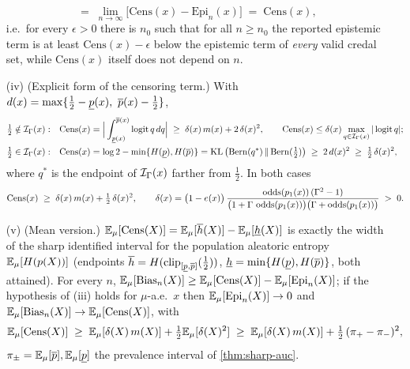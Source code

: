 \begin{corollary}
\begin{enumerate}
\begin{equation}
    \;=\;\lim_{n\to\infty}\big[\mathrm{Cens}(x)-\mathrm{Epi}_n(x)\big]\;=\;\mathrm{Cens}(x),
    \label{eq:uq-overconf}
  \end{equation}
  i.e.\ for every $\epsilon>0$ there is $n_0$ such that for all $n\ge n_0$ the reported
  epistemic term is at least $\mathrm{Cens}(x)-\epsilon$ below the epistemic term of
  \emph{every} valid credal set, while $\mathrm{Cens}(x)$ itself does not depend on $n$.
\item[(iv)] \textup{(Explicit form of the censoring term.)} With
  $d(x)=\max\{\tfrac12-\plo(x),\ \pup(x)-\tfrac12\}$,
  \begin{align}
    \tfrac12\notin\mathcal{I}_\Gamma(x):&\quad
      \mathrm{Cens}(x)=\Big|\int_{\underline{p}(x)}^{\overline{p}(x)}\operatorname{logit} q\,dq\Big|
      \;\ge\;\delta(x)\,m(x)+2\,\delta(x)^2,\qquad
      \mathrm{Cens}(x)\le\delta(x)\max_{q\in\mathcal{I}_\Gamma(x)}|\operatorname{logit} q|;
      \label{eq:cens-mono}\\
    \tfrac12\in\mathcal{I}_\Gamma(x):&\quad
      \mathrm{Cens}(x)=\log2-\min\{H(\underline{p}),H(\overline{p})\}
      =\operatorname{KL}\big(\mathrm{Bern}(q^\ast)\,\|\,\mathrm{Bern}(\tfrac12)\big)
      \;\ge\;2\,d(x)^2\;\ge\;\tfrac12\,\delta(x)^2,
      \label{eq:cens-inside}
  \end{align}
  where $q^\ast$ is the endpoint of $\mathcal{I}_\Gamma(x)$ farther from $\tfrac12$. In both cases
  \begin{equation}
    \mathrm{Cens}(x)\;\ge\;\delta(x)\,m(x)+\tfrac12\,\delta(x)^2,
    \qquad
    \delta(x)=\big(1-e(x)\big)\,\frac{\operatorname{odds}(p_1(x))\,(\Gamma^2-1)}
        {\big(1+\Gamma\,\operatorname{odds}(p_1(x))\big)\big(\Gamma+\operatorname{odds}(p_1(x))\big)}\;>\;0 .
    \label{eq:cens-unified}
  \end{equation}
\item[(v)] \textup{(Mean version.)} $\mathbb{E}_\mu[\mathrm{Cens}(X)]=\mathbb{E}_\mu[\overline h(X)]-\mathbb{E}_\mu[\underline h(X)]$
  is exactly the width of the sharp identified interval for the population aleatoric entropy
  $\mathbb{E}_\mu[H(p(X))]$ (endpoints $\overline h=H(\mathrm{clip}_{[\underline{p},\overline{p}]}(\tfrac12))$,
  $\underline h=\min\{H(\underline{p}),H(\overline{p})\}$, both attained). For every $n$,
  $\mathbb{E}_\mu[\mathrm{Bias}_n(X)]\ge\mathbb{E}_\mu[\mathrm{Cens}(X)]-\mathbb{E}_\mu[\mathrm{Epi}_n(X)]$; if the
  hypothesis of (iii) holds for $\mu$-a.e.\ $x$ then $\mathbb{E}_\mu[\mathrm{Epi}_n(X)]\to0$ and
  $\mathbb{E}_\mu[\mathrm{Bias}_n(X)]\to\mathbb{E}_\mu[\mathrm{Cens}(X)]$, with
  \begin{equation}
    \mathbb{E}_\mu[\mathrm{Cens}(X)]\;\ge\;\mathbb{E}_\mu[\delta(X)\,m(X)]+\tfrac12\mathbb{E}_\mu[\delta(X)^2]
    \;\ge\;\mathbb{E}_\mu[\delta(X)\,m(X)]+\tfrac12\,(\pi_+-\pi_-)^2,
    \label{eq:cens-mean}
  \end{equation}
  $\pi_\pm=\mathbb{E}_\mu[\overline{p}],\mathbb{E}_\mu[\underline{p}]$ the prevalence interval of \cref{thm:sharp-auc}.
\end{enumerate}
\end{corollary}

